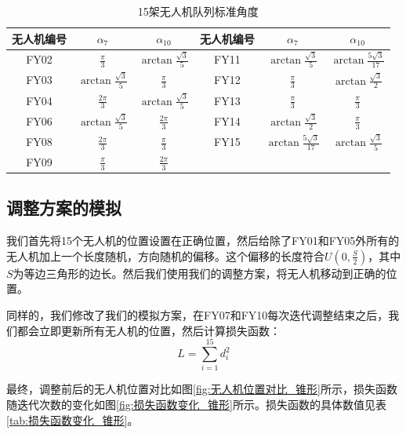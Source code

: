 \documentclass[12pt,AutoFakeSlant,AutoFakeBold]{article}
\begin{document}
\begin{table}[!ht]
    \centering
    \caption{15架无人机队列标准角度}
    \label{tab:锥形队列标准角度}
    \begin{tabular}{ccc|ccc}
    \toprule
        无人机编号 & $\alpha_7$ & $\alpha_{10}$ & 无人机编号 & $\alpha_7$ & $\alpha_{10}$ \\ 
        \midrule
        FY02 & $\frac{\pi}{3}$ & $\arctan\frac{\sqrt{3}}{5}$ & FY11 & $\arctan\frac{\sqrt{3}}{5}$ & $\arctan\frac{5\sqrt{3}}{17}$ \\ 
        FY03 & $\arctan\frac{\sqrt{3}}{5}$ & $\frac{\pi}{3}$ & FY12 & $\frac{\pi}{3}$ & $\arctan\frac{\sqrt{3}}{2}$\\ 
        FY04 & $\frac{2\pi}{3}$ & $\arctan\frac{\sqrt{3}}{5}$ & FY13 & $\frac{\pi}{3}$ & $\frac{\pi}{3}$ \\ 
        FY06 & $\arctan\frac{\sqrt{3}}{5}$ & $\frac{2\pi}{3}$ & FY14 & $\arctan\frac{\sqrt{3}}{2}$ & $\frac{\pi}{3}$ \\ 
        FY08 & $\frac{2\pi}{3}$ & $\frac{\pi}{3}$ & FY15 & $\arctan\frac{5\sqrt{3}}{17}$ & $\arctan\frac{\sqrt{3}}{5}$ \\ 
        FY09 & $\frac{\pi}{3}$ & $\frac{2\pi}{3}$ \\ 
    \bottomrule
    \end{tabular}
\end{table}

\subsection{调整方案的模拟}

我们首先将15个无人机的位置设置在正确位置，然后给除了FY01和FY05外所有的无人机加上一个长度随机，方向随机的偏移。这个偏移的长度符合$U\left(0,\frac{S}{2}\right)$，其中$S$为等边三角形的边长。然后我们使用我们的调整方案，将无人机移动到正确的位置。

同样的，我们修改了我们的模拟方案，在FY07和FY10每次迭代调整结束之后，我们都会立即更新所有无人机的位置，然后计算损失函数：
\begin{equation}
    L = \sum_{i=1}^{15} d_i^2
\end{equation}

最终，调整前后的无人机位置对比如图\ref{fig:无人机位置对比_锥形}所示，损失函数随迭代次数的变化如图\ref{fig:损失函数变化_锥形}所示。损失函数的具体数值见表\ref{tab:损失函数变化_锥形}。
\end{document}
